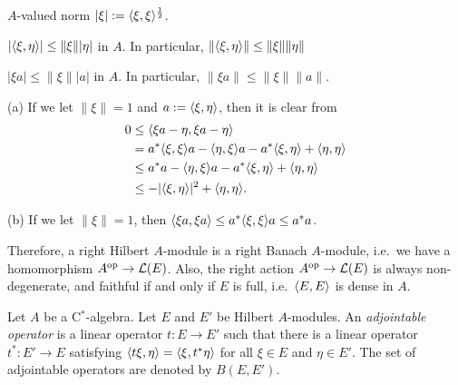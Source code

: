 \documentclass{../../../small}
\begin{document}
\begin{prop}
$A$-valued norm $|\xi|:=\langle\xi,\xi\rangle^{\frac12}$.
\begin{parts}
\item $|\langle\xi,\eta\rangle|\le\|\xi\||\eta|$ in $A$. In particular, $\|\langle\xi,\eta\rangle\|\le\|\xi\|\|\eta\|$
\item $|\xi a|\le\|\xi\||a|$ in $A$. In particular, $\|\xi a\|\le\|\xi\|\|a\|$.
\end{parts}
\end{prop}
\begin{pf}
(a)
If we let $\|\xi\|=1$ and $a:=\langle\xi,\eta\rangle$, then it is clear from
\begin{align*}
0&\le\langle\xi a-\eta,\xi a-\eta\rangle\\
&=a^*\langle\xi,\xi\rangle a-\langle\eta,\xi\rangle a-a^*\langle\xi,\eta\rangle+\langle\eta,\eta\rangle\\
&\le a^*a-\langle\eta,\xi\rangle a-a^*\langle\xi,\eta\rangle+\langle\eta,\eta\rangle\\
&\le-|\langle\xi,\eta\rangle|^2+\langle\eta,\eta\rangle.
\end{align*}

(b)
If we let $\|\xi\|=1$, then $\langle\xi a,\xi a\rangle\le a^*\langle\xi,\xi\rangle a\le a^*a$.
\end{pf}

Therefore, a right Hilbert $A$-module is a right Banach $A$-module, i.e.~we have a homomorphism $A^{\mathrm{op}}\to\mathcal{L}(E)$.
Also, the right action $A^{\mathrm{op}}\to\mathcal{L}(E)$ is always non-degenerate, and faithful if and only if $E$ is full, i.e.~$\langle E,E\rangle$ is dense in $A$.


\begin{defn}
Let $A$ be a C$^*$-algebra.
Let $E$ and $E'$ be Hilbert $A$-modules.
An \emph{adjointable operator} is a linear operator $t:E\to E'$ such that there is a linear operator $t^*:E'\to E$ satisfying $\langle t\xi,\eta\rangle=\langle\xi,t^*\eta\rangle$ for all $\xi\in E$ and $\eta\in E'$.
The set of adjointable operators are denoted by $B(E,E')$.
\end{defn}
\end{document}
